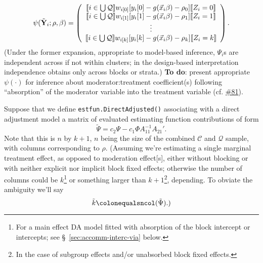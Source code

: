 \documentclass{article}
\newcommand{\defeq}{\ensuremath{\colonequals}}
\DeclarePairedDelimiter{\indicator}{\llbracket}{\rrbracket}
\newcommand{\owt}[1][z_i]{\ensuremath{w_{i[#1]}}}
\begin{document}
\begin{equation*}
           \psi(\tilde{\mathbf{Y}}_{i}; \rho, \beta) =
         \left( \begin{array}{c}
           \indicator{i \in \bigcup \mathcal{Q}}\owt[0][y_{i}[0] - g(\vec{x}_{i}\beta)-
                  \rho_{0}]\indicator{Z_{i}=0}\\
           \indicator{i \in \bigcup \mathcal{Q}}\owt[1][y_{i}[1] - g(\vec{x}_{i}\beta)-
                  \rho_{1}]\indicator{Z_{i}=1}\\
                  \vdots \\
           \indicator{i \in \bigcup \mathcal{Q}}\owt[k][y_{i}[k] - g(\vec{x}_{i}\beta)-
                  \rho_{k}]\indicator{Z_{i}=k}\\                  
                \end{array}\right).
\end{equation*}
(Under the former expansion, appropriate to model-based inference,
${\Psi}_{i}$s are independent across if not within
clusters; in the design-based interpretation independence obtains only across blocks or
strata.)  \textbf{To do}: present appropriate $\psi(\cdot)$ for inference
about moderator:treatment coefficient(s) following ``absorption'' of the moderator
variable into the treatment variable (cf. \href{https://github.com/benbhansen-stats/flexida/issues/81#issuecomment-1282944562}{\#81}).
      
       Suppose that we define \texttt{estfun.DirectAdjusted()} associating
with a direct adjustment model a matrix of evaluated estimating function
contributions of form
\begin{equation*}
  \tilde{\Psi} = c_{2}\Psi - c_{1}\Phi A_{11}^{-1}A_{21}'.
\end{equation*}
Note that this is $n$ by
$k+1$, $n$ being the size of the combined $\mathcal{C}$ and
$\mathcal{Q}$ sample, with columns corresponding to $\rho$.%
(Assuming we're estimating a single marginal treatment effect, as
opposed to moderation effect[s], either without blocking or with
neither explicit nor implicit block fixed effects; otherwise the
number of columns could be $k$\footnote{For a main effect
DA model fitted with absorption of the block intercept or
intercepts; see \S~\ref{sec:accomm-interc-via} below.} or something
larger than $k+1$\footnote{In the case of subgroup effects and/or unabsorbed block fixed effects.},
depending. To obviate the ambiguity we'll say
\begin{equation*}
  \tilde{k} \defeq \mathtt{ncol}(\tilde{\Psi}).)
\end{equation*}
\end{document}
